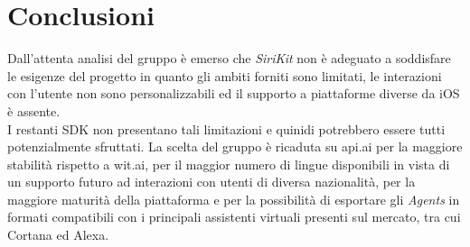 \documentclass[a4paper,titlepage]{article}
\begin{document}
	\section{Conclusioni}
	Dall'attenta analisi del gruppo \GRUPPO{} è emerso che \textit{SiriKit} non è adeguato a soddisfare le esigenze del progetto \PROGETTO{} in quanto gli ambiti forniti sono limitati, le interazioni con l'utente non sono personalizzabili ed il supporto a piattaforme diverse da iOS è assente.\\
	I restanti SDK non presentano tali limitazioni e quinidi potrebbero essere tutti potenzialmente sfruttati. La scelta del gruppo è ricaduta su api.ai per la maggiore stabilità rispetto a wit.ai, per il  maggior numero di lingue disponibili in vista di un supporto futuro ad interazioni con utenti di diversa nazionalità, per la maggiore maturità della piattaforma e per la possibilità di esportare gli \textit{Agents} in formati compatibili con i principali assistenti virtuali presenti sul mercato, tra cui Cortana ed Alexa.
	
	
	
\end{document}
